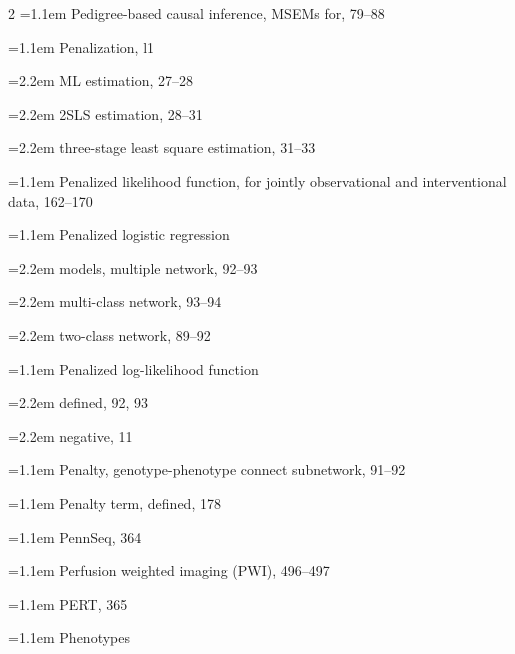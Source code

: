 \begin{multicols}{2}
\noindent\hangindent=1.1em Pedigree-based causal inference, MSEMs for, 79--88\par
\noindent\hangindent=1.1em Penalization, l1\par
\noindent\hangindent=2.2em \hspace*{1.1em}ML estimation, 27--28\par
\noindent\hangindent=2.2em \hspace*{1.1em}2SLS estimation, 28--31\par
\noindent\hangindent=2.2em \hspace*{1.1em}three-stage least square estimation, 31--33\par
\noindent\hangindent=1.1em Penalized likelihood function, for jointly observational and interventional data, 162--170\par
\noindent\hangindent=1.1em Penalized logistic regression\par
\noindent\hangindent=2.2em \hspace*{1.1em}models, multiple network, 92--93\par
\noindent\hangindent=2.2em \hspace*{1.1em}multi-class network, 93--94\par
\noindent\hangindent=2.2em \hspace*{1.1em}two-class network, 89--92\par
\noindent\hangindent=1.1em Penalized log-likelihood function\par
\noindent\hangindent=2.2em \hspace*{1.1em}defined, 92, 93\par
\noindent\hangindent=2.2em \hspace*{1.1em}negative, 11\par
\noindent\hangindent=1.1em Penalty, genotype-phenotype connect subnetwork, 91--92\par
\noindent\hangindent=1.1em Penalty term, defined, 178\par
\noindent\hangindent=1.1em PennSeq, 364\par
\noindent\hangindent=1.1em Perfusion weighted imaging (PWI), 496--497\par
\noindent\hangindent=1.1em PERT, 365\par
\noindent\hangindent=1.1em Phenotypes\par

\end{multicols}
